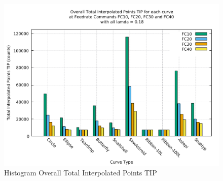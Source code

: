 \clearpage
\pagebreak
\begin{landscape}

\begin{figure}
\caption  {Histogram Overall Total Interpolated Points TIP}
\label{img-Histogram Overall Total Interpolated Points TIP}
\includegraphics[width=1.30\textwidth]{Chap4/Overall/Histogram/TIP-img-Histo-Overall-Total-Interpolated-Points.pdf} 
\end{figure}

\end{landscape}
\clearpage
\pagebreak
